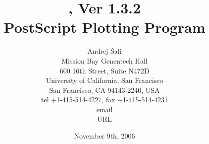 \title{\vspace{3cm} \ASGL, Ver 1.3.2 \\[1cm]
       PostScript Plotting Program \\[3cm]}

\author{Andrej \v{S}ali \\[0.5cm]
Mission Bay Genentech Hall \\
600 16th Street, Suite N472D \\
University of California, San Francisco \\
San Francisco, CA 94143-2240, USA \\
tel +1-415-514-4227, fax +1-415-514-4231  \\
email  \\
URL 
}

\date{November 9th, 2006}
